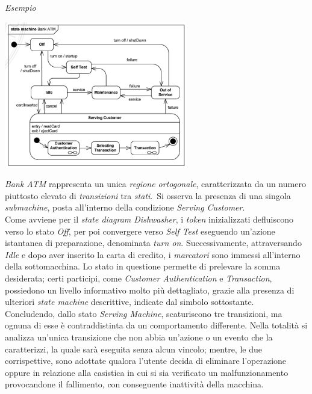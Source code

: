 \documentclass{article}
\begin{document}
\textit{Esempio}\vspace*{7pt}
\begin{center}
    \includegraphics*[width=0.6\textwidth]{foto 11.png}
\end{center}
\textit{Bank ATM} rappresenta un unica \textit{regione ortogonale}, caratterizzata da un numero piuttosto elevato di \textit{transizioni} tra \textit{stati}.\ Si osserva la presenza di una singola \textit{submachine}, posta all'interno della condizione \textit{Serving Customer}.\vspace*{14pt}\\
Come avviene per il \textit{state diagram Dishwasher}, i \textit{token} inizializzati defluiscono verso lo stato \textit{Off}, per poi convergere verso \textit{Self Test} eseguendo un'azione istantanea di preparazione, denominata \textit{turn on}. Successivamente, attraversando \textit{Idle} e dopo aver inserito la carta di credito, i \textit{marcatori} sono immessi all'interno della sottomacchina. Lo stato in questione permette di prelevare la somma desiderata; certi participi, come \textit{Customer Authentication} e  \textit{Transaction}, possiedono un livello informativo molto più dettagliato, grazie alla presenza di ulteriori \textit{state machine} descrittive, indicate dal simbolo sottostante.\vspace*{14pt}\\
Concludendo, dallo stato \textit{Serving Machine}, scaturiscono tre transizioni, ma ognuna di esse è contraddistinta da un comportamento differente. Nella totalità si analizza un'unica transizione che non abbia un'azione o un evento che la caratterizzi, la quale sarà eseguita senza alcun vincolo; mentre, le due corrispettive, sono adottate qualora l'utente decida di eliminare l'operazione oppure in relazione alla casistica in cui si sia verificato un malfunzionamento provocandone il fallimento, con conseguente inattività della macchina.
\end{document}
